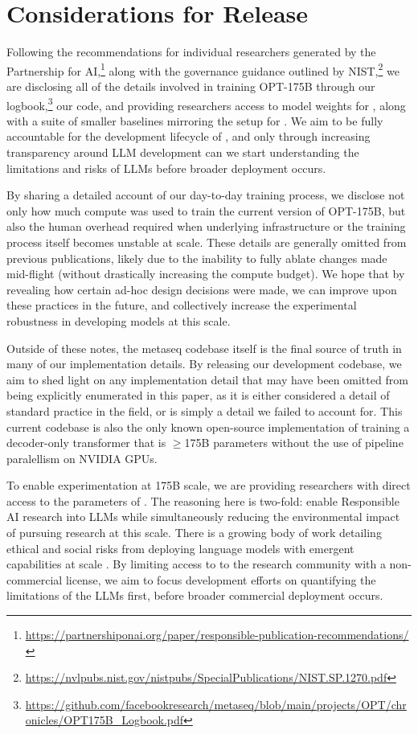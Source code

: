 \section{Considerations for Release}
\label{sec:release}
Following the recommendations for individual researchers generated by the Partnership for AI,\footnote{\url{https://partnershiponai.org/paper/responsible-publication-recommendations/}} along with the governance guidance outlined by NIST,\footnote{\url{https://nvlpubs.nist.gov/nistpubs/SpecialPublications/NIST.SP.1270.pdf}} we are disclosing all of the details involved in training OPT-175B through our logbook,\footnote{\url{https://github.com/facebookresearch/metaseq/blob/main/projects/OPT/chronicles/OPT175B_Logbook.pdf}} our code, and providing researchers access to model weights for \OPT{}, along with a suite of smaller baselines mirroring the setup for \OPT{}.  We aim to be fully accountable for the development lifecycle of \OPT{}, and only through increasing transparency around LLM development can we start understanding the limitations and risks of LLMs before broader deployment occurs.

By sharing a detailed account of our day-to-day training process, we disclose not only how much compute was used to train the current version of OPT-175B, but also the human overhead required when underlying infrastructure or the training process itself becomes unstable at scale.  These details are generally omitted from previous publications, likely due to the inability to fully ablate changes made mid-flight (without drastically increasing the compute budget).  We hope that by revealing how certain ad-hoc design decisions were made, we can improve upon these practices in the future, and collectively increase the experimental robustness in developing models at this scale.

Outside of these notes, the metaseq codebase itself is the final source of truth in many of our implementation details.  By releasing our development codebase, we aim to shed light on any implementation detail that may have been omitted from being explicitly enumerated in this paper, as it is either considered a detail of standard practice in the field, or is simply a detail we failed to account for.  This current codebase is also the only known open-source implementation of training a decoder-only transformer that is $\geq$175B parameters without the use of pipeline paralellism on NVIDIA GPUs.

To enable experimentation at 175B scale, we are providing researchers with direct access to the parameters of \OPT{}. The reasoning here is two-fold: enable Responsible AI research into LLMs while simultaneously reducing the environmental impact of pursuing research at this scale.  There is a growing body of work detailing ethical and social risks from deploying language models with emergent capabilities at scale \cite{deepmindLMrisks2021,foundation2021,dinan2021anticipating,alignmentagents2021}. By limiting access to \OPT{} to the research community with a non-commercial license, we aim to focus development efforts on quantifying the limitations of the LLMs first, before broader commercial deployment occurs.
 
